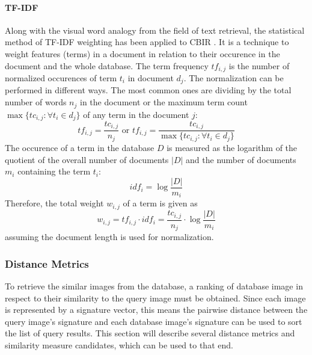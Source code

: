 \paragraph{TF-IDF}

Along with the visual word analogy from the field of text retrieval, the
statistical method of TF-IDF weighting \autocite{baeza-yates_modern_1999} has
been applied to CBIR \autocite{sivic_video_2003}. It is a technique to weight
features (terms) in a document in relation to their occurence in the document
and the whole database. The term frequency $tf_{i, j}$ is the number of
normalized occurences of term $t_i$ in document $d_j$. The normalization can be
performed in different ways. The most common ones are dividing by the total
number of words $n_j$ in the document or the maximum term count $\max \{ tc_{i,
j} : \forall t_i \in d_j \}$ of any term in the document $j$:
\begin{equation*}
    tf_{i, j} = \frac{tc_{i, j}}{n_j} \text{ or } tf_{i, j} = \frac{tc_{i, j}}{\max \{ tc_{i, j} : \forall t_i \in d_j \}}
\end{equation*}
The occurence of a term in the database $D$ is measured as the logarithm of the
quotient of the overall number of documents $|D|$ and the number of documents
$m_i$ containing the term $t_i$:
\begin{equation*}
    idf_{i} = \log \frac{|D|}{m_i}
\end{equation*}
Therefore, the total weight $w_{i, j}$ of a term is given as
\begin{equation*}
    w_{i, j} = tf_{i, j} \cdot idf_{i} = \frac{tc_{i, j}}{n_j} \cdot \log \frac{|D|}{m_i}
\end{equation*}
assuming the document length is used for normalization.

\subsubsection{Distance Metrics}\label{sec:anatomy_ranking_distance}

To retrieve the similar images from the database, a ranking of database image
in respect to their similarity to the query image must be obtained. Since each
image is represented by a signature vector, this means the pairwise distance
between the query image's signature and each database image's signature can be
used to sort the list of query results. This section will describe several
distance metrics and similarity measure candidates, which can be used to that
end.

